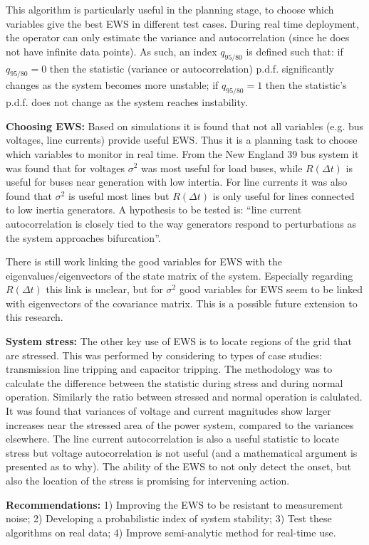 \documentclass[12pt, a4paper]{report}
\begin{document}
This algorithm is particularly useful in the planning stage, to choose which variables give the best EWS in different test cases. During real time deployment, the operator can only estimate the variance and autocorrelation (since he does not have infinite data points). As such, an index $q_{95/80}$ is defined such that: if $q_{95/80}=0$ then the statistic (variance or autocorrelation) p.d.f. significantly changes as the system becomes more unstable; if $q_{95/80}=1$ then the statistic's p.d.f. does not change as the system reaches instability.\par
\textbf{Choosing EWS:} Based on simulations it is found that not all variables (e.g. bus voltages, line currents) provide useful EWS. Thus it is a planning task to choose which variables to monitor in real time. From the New England 39 bus system it was found that for voltages $\sigma^2$ was most useful for load buses, while $R(\Delta t)$ is useful for buses near generation with low intertia. For line currents it was also found that $\sigma^2$ is useful most lines but $R(\Delta t)$ is only useful for lines connected to low inertia generators. A hypothesis to be tested is: ``line current autocorrelation is closely tied to the way generators respond to perturbations as the system approaches bifurcation''.\par
There is still work linking the good variables for EWS with the eigenvalues/eigenvectors of the state matrix of the system. Especially regarding $R(\Delta t)$ this link is unclear, but for $\sigma^2$ good variables for EWS seem to be linked with eigenvectors of the covariance matrix. This is a possible future extension to this research.\par
\textbf{System stress:} The other key use of EWS is to locate regions of the grid that are stressed. This was performed by considering to types of case studies: transmission line tripping and capacitor tripping. The methodology was to calculate the difference between the statistic during stress and during normal operation. Similarly the ratio between stressed and normal operation is calulated. It was found that variances of voltage and current magnitudes show larger increases near the stressed area of the power system, compared to the variances elsewhere. The line current autocorrelation is also a useful statistic to locate stress but voltage autocorrelation is not useful (and a mathematical argument is presented as to why). The ability of the EWS to not only detect the onset, but also the location of the stress is promising for intervening action.\par
\textbf{Recommendations:} 1) Improving the EWS to be resistant to measurement noise; 2) Developing a probabilistic index of system stability; 3) Test these algorithms on real data; 4) Improve semi-analytic method for real-time use.
\end{document}
